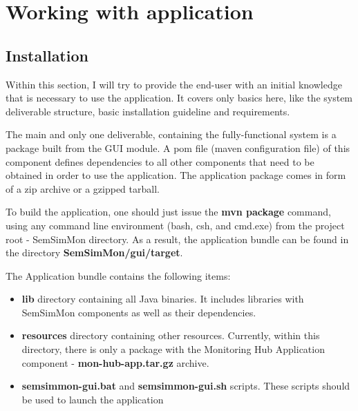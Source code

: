 %
\section{Working with application}

\subsection{Installation}
\label{sec:ch7_working_with}

Within this section, I will try to provide the end-user with an initial knowledge that is necessary to use the application. It covers only basics here, like the system deliverable structure, basic installation guideline and requirements.

The main and only one deliverable, containing the fully-functional system is a package built from the GUI module. A pom file (maven configuration file) of this component defines dependencies to all other components that need to be obtained in order to use the application. The application package comes in  form of a zip archive or a gzipped tarball.

To build the application, one should just issue the {\bf mvn package} command, using any command line environment (bash, csh, and cmd.exe) from the project root - SemSimMon directory. As a result, the application bundle can be found in the directory {\bf SemSimMon/gui/target}.

The Application bundle contains the following items:

\begin{itemize}

\item {\bf lib} directory containing all Java binaries. It includes libraries with SemSimMon components as well as their dependencies.

\item {\bf resources} directory containing other resources. Currently, within this directory, there is only a package with the Monitoring Hub Application component - {\bf mon-hub-app.tar.gz} archive.

\item {\bf semsimmon-gui.bat} and {\bf semsimmon-gui.sh} scripts. These scripts should be used to launch the application 

\end{itemize} 

